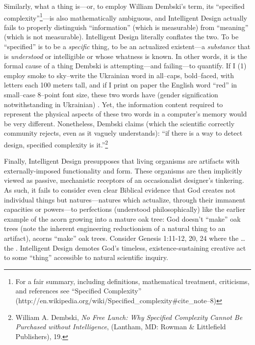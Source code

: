 Similarly, what a thing is---or, to employ William Dembski's term, its ``specified complexity''\footnote{For a fair summary, including definitions, mathematical treatment, criticisms, and references see “Specified Complexity” (http://en.wikipedia.org/wiki/Specified\_complexity\#cite\_note--8)}---is also mathematically ambiguous, and Intelligent Design actually fails to properly distinguish ``information'' (which is measurable) from ``meaning'' (which is not measurable).  Intelligent Design literally conflates the two. To be ``specified'' is to be a \textit{specific} thing, to be an actualized existent---a \textit{substance} that is \textit{understood} or intelligible or whose whatness is known. In other words, it is the formal cause of a thing Dembski is attempting---and failing---to quantify.  If I (1) employ smoke to sky--write the Ukrainian word  in all--caps, bold--faced, with letters each 100 meters tall, and if I print on paper the English word ``red'' in small--case 8--point font size, these two words have (gender signification notwithstanding in Ukrainian) . Yet, the information content required to represent the physical aspects of these two words in a computer's memory would be very different.  Nonetheless, Dembski claims (which the scientific correctly community rejects, even as it vaguely understands): ``if there is a way to detect design, specified complexity is it.''\footnote{William A. Dembski, \textit{No Free Lunch: Why Specified Complexity Cannot Be Purchased without Intelligence}, (Lantham, MD: Rowman \& Littlefield Publishers), 19.}

Finally, Intelligent Design presupposes that living organisms are artifacts with externally-imposed functionality and form. These organisms are then implicitly viewed as passive, mechanistic receptors of an occasionalist designer's tinkering. As such, it fails to consider even clear Biblical evidence that God creates not individual things but natures---natures which actualize, through their immanent capacities or powers---to perfections (understood philosophically) like the earlier example of the acorn growing into a mature oak tree: God doesn't ``make'' oak trees (note the inherent engineering reductionism of a natural thing to an artifact), acorns ``make'' oak trees. Consider Genesis 1:11-12, 20, 24 where the \ldots the . Intelligent Design demotes God's timeless, existence-sustaining creative act to some ``thing'' accessible to natural scientific inquiry.

